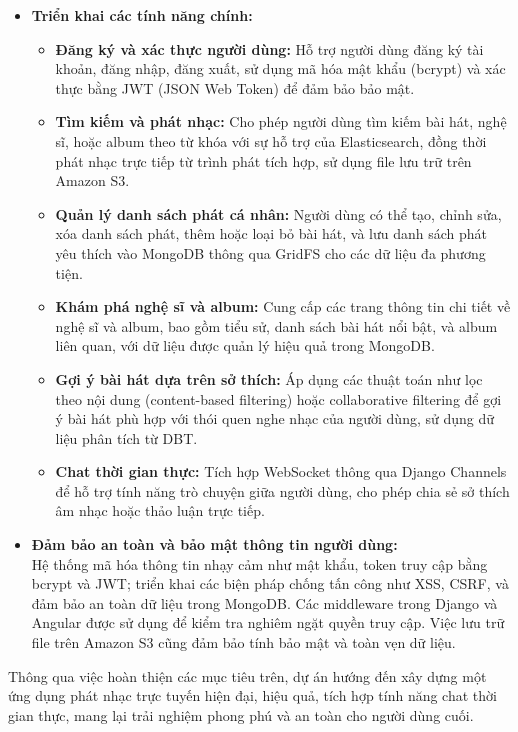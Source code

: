 \documentclass[a4paper,12pt]{report}
\begin{document}
\begin{itemize}
    \item \textbf{Triển khai các tính năng chính:}
    \begin{itemize}
        \item \textbf{Đăng ký và xác thực người dùng:} Hỗ trợ người dùng đăng ký tài khoản, đăng nhập, đăng xuất, sử dụng mã hóa mật khẩu (bcrypt) và xác thực bằng JWT (JSON Web Token) để đảm bảo bảo mật.
        \item \textbf{Tìm kiếm và phát nhạc:} Cho phép người dùng tìm kiếm bài hát, nghệ sĩ, hoặc album theo từ khóa với sự hỗ trợ của Elasticsearch, đồng thời phát nhạc trực tiếp từ trình phát tích hợp, sử dụng file lưu trữ trên Amazon S3.
        \item \textbf{Quản lý danh sách phát cá nhân:} Người dùng có thể tạo, chỉnh sửa, xóa danh sách phát, thêm hoặc loại bỏ bài hát, và lưu danh sách phát yêu thích vào MongoDB thông qua GridFS cho các dữ liệu đa phương tiện.
        \item \textbf{Khám phá nghệ sĩ và album:} Cung cấp các trang thông tin chi tiết về nghệ sĩ và album, bao gồm tiểu sử, danh sách bài hát nổi bật, và album liên quan, với dữ liệu được quản lý hiệu quả trong MongoDB.
        \item \textbf{Gợi ý bài hát dựa trên sở thích:} Áp dụng các thuật toán như lọc theo nội dung (content-based filtering) hoặc collaborative filtering để gợi ý bài hát phù hợp với thói quen nghe nhạc của người dùng, sử dụng dữ liệu phân tích từ DBT.
        \item \textbf{Chat thời gian thực:} Tích hợp WebSocket thông qua Django Channels để hỗ trợ tính năng trò chuyện giữa người dùng, cho phép chia sẻ sở thích âm nhạc hoặc thảo luận trực tiếp.
    \end{itemize}

    \item \textbf{Đảm bảo an toàn và bảo mật thông tin người dùng:} \\
    Hệ thống mã hóa thông tin nhạy cảm như mật khẩu, token truy cập bằng bcrypt và JWT; triển khai các biện pháp chống tấn công như XSS, CSRF, và đảm bảo an toàn dữ liệu trong MongoDB. Các middleware trong Django và Angular được sử dụng để kiểm tra nghiêm ngặt quyền truy cập. Việc lưu trữ file trên Amazon S3 cũng đảm bảo tính bảo mật và toàn vẹn dữ liệu.
\end{itemize}

Thông qua việc hoàn thiện các mục tiêu trên, dự án hướng đến xây dựng một ứng dụng phát nhạc trực tuyến hiện đại, hiệu quả, tích hợp tính năng chat thời gian thực, mang lại trải nghiệm phong phú và an toàn cho người dùng cuối.
\end{document}
